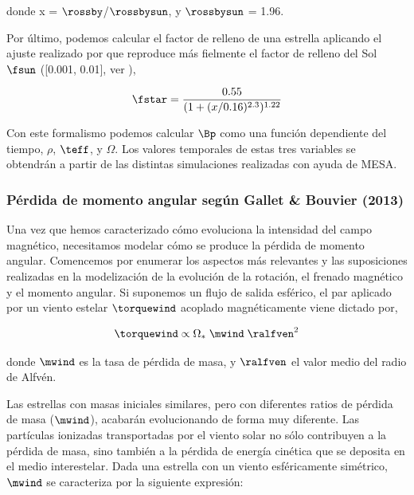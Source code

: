 donde x = $\rossby$/$\rossbysun$, y $\rossbysun$ = 1.96. \par

Por último, podemos calcular el factor de relleno de una estrella aplicando el ajuste realizado por \cite{Gallet2013} que reproduce más fielmente el factor de relleno del Sol $\fsun$ ([0.001, 0.01], ver \cite{Cranmer2011}),

\begin{equation}
	\fstar = \frac{0.55}{(1+(x/0.16)^{2.3})^{1.22}} \label{eq:fstart}
\end{equation}



Con este formalismo podemos calcular $\Bp$ como una función dependiente del tiempo, $\rho$, $\teff$, y $\Omega$. Los valores temporales de estas tres variables se obtendrán a partir de las distintas simulaciones realizadas con ayuda de MESA. \par


\subsubsection{Pérdida de momento angular según Gallet \& Bouvier (2013)}

Una vez que hemos caracterizado cómo evoluciona la intensidad del campo magnético, necesitamos modelar cómo se produce la pérdida de momento angular. Comencemos por enumerar los aspectos más relevantes y las suposiciones realizadas en la modelización de la evolución de la rotación, el frenado magnético y el momento angular. Si suponemos un flujo de salida esférico, el par aplicado por un viento estelar $\torquewind$ acoplado magnéticamente viene dictado por,

\begin{equation}
	\torquewind \propto \Omega_* \; \mwind \; \ralfven^{2} \label{eq:mb_torque}
\end{equation}

donde $\mwind$ es la tasa de pérdida de masa, y $\ralfven$ el valor medio del radio de Alfvén. \par

Las estrellas con masas iniciales similares, pero con diferentes ratios de pérdida de masa ($\mwind$), acabarán evolucionando de forma muy diferente. Las partículas ionizadas transportadas por el viento solar no sólo contribuyen a la pérdida de masa, sino también a la pérdida de energía cinética que se deposita en el medio interestelar. Dada una estrella con un viento esféricamente simétrico, $\mwind$ se caracteriza por la siguiente expresión:

